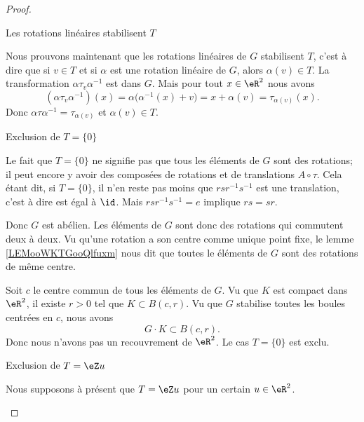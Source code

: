 \begin{proof}
\begin{subproof}
        \item[Les rotations linéaires stabilisent \( T\)]

            Nous prouvons maintenant que les rotations linéaires de \( G\) stabilisent \( T\), c'est à dire que si \( v\in T\) et si \( \alpha\) est une rotation linéaire de \( G\), alors \( \alpha(v)\in T\). La transformation \( \alpha\tau_v\alpha^{-1}\) est dans \( G\). Mais pour tout \( x\in \eR^2\) nous avons
            \begin{equation}        \label{EQooLLZVooUuabir}
                (\alpha\tau_v\alpha^{-1})(x)=\alpha\big( \alpha^{-1}(x)+v \big)=x+\alpha(v)=\tau_{\alpha(v)}(x).
            \end{equation}
            Donc \( \alpha\tau\alpha^{-1}=\tau_{\alpha(v)}\) et \( \alpha(v)\in T\).
            
        \item[Exclusion de \( T=\{ 0 \}\)]

            Le fait que \( T=\{ 0 \}\) ne signifie pas que tous les éléments de \( G\) sont des rotations; il peut encore y avoir des composées de rotations et de translations \( A\circ \tau\). Cela étant dit, si \( T=\{ 0 \}\), il n'en reste pas moins que \( rsr^{-1}s^{-1}\) est une translation, c'est à dire est égal à \( \id\). Mais \( rsr^{-1}s^{-1}=e\) implique \( rs=sr\).

            Donc \( G\) est abélien. Les éléments de \( G\) sont donc des rotations qui commutent deux à deux. Vu qu'une rotation a son centre comme unique point fixe, le lemme \ref{LEMooWKTGooQlfuxm} nous dit que toutes le éléments de \( G\) sont des rotations de même centre.

            Soit \( c\) le centre commun de tous les éléments de \( G\). Vu que \( K\) est compact dans \( \eR^2\), il existe \( r>0\) tel que \( K\subset B(c,r)\). Vu que \( G\) stabilise toutes les boules centrées en \( c\), nous avons
            \begin{equation}
                G\cdot K\subset B(c,r).
            \end{equation}
            Donc nous n'avons pas un recouvrement de \( \eR^2\). Le cas \( T=\{0  \}\) est exclu.

        \item[Exclusion de \( T=\eZ u\)]

            Nous supposons à présent que \( T=\eZ u\) pour un certain \( u\in \eR^2\). 


\end{subproof}
\end{proof}
